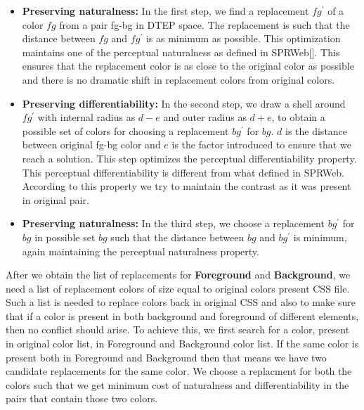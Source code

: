 \begin{itemize}

\item {\textbf{Preserving naturalness:} } In the first step, we find a replacement $fg^{\prime}$ of a color $fg$ from a pair fg-bg in DTEP space. The replacement is such that the distance between $fg$ and $fg^{\prime}$ is as minimum as possible. This optimization maintains one of the perceptual naturalness as defined in SPRWeb[]. This ensures that the replacement color is as close to the original color as possible and there is no dramatic shift in replacement colors from original colors.

\item{\textbf{Preserving differentiability:} } In the second step, we draw a shell around $fg^{\prime}$ with internal radius as $d-e$ and outer radius as $d+e$, to obtain a possible set of colors for choosing a replacement $bg^{\prime}$ for $bg$. $d$ is the distance between original fg-bg color and $e$ is the factor introduced to ensure that we reach a solution. This step optimizes the perceptual differentiability property. This perceptual differentiability is different from what defined in SPRWeb. According to this property we try to maintain the contrast as it was present in original pair.

\item{\textbf{Preserving naturalness:} } In the third step, we choose a replacement $bg^{\prime}$ for $bg$ in possible set $bg$ such that the distance between $bg$ and $bg^{\prime}$ is minimum, again maintaining the perceptual naturalness property. 

\end{itemize}

After we obtain the list of replacements for \textbf{Foreground} and \textbf{Background}, we need a list of replacement colors of size equal to original colors present CSS file. Such a list is needed to replace colors back in original CSS and also to make sure that if a color is present in both background and foreground of different elements, then no conflict should arise. To achieve this, we first search for a color, present in original color list, in Foreground and Background color list. If the same color is present both in Foreground and Background then that means we have two candidate replacements for the same color. We choose a replacment for both the colors such that we get minimum cost of naturalness and differentiability in the pairs that contain those two colors. 

